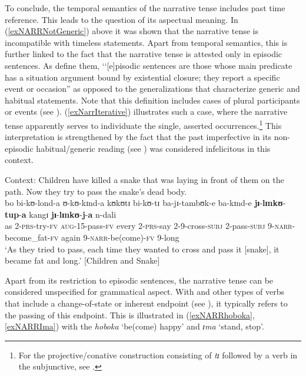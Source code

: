 \label{Episodic}
To conclude, the temporal semantics of the narrative tense includes past time reference. This leads to the question of its aspectual meaning. In (\ref{exNARRNotGeneric}) above it was shown that the narrative tense is incompatible with timeless  statements. Apart from temporal semantics, this is further linked to the fact that the narrative tense is attested only in episodic sentences. As \citet[36]{KrifkaMetal1995} define them, \lq\lq [e]pisodic sentences are those whose main predicate has a situation argument bound by existential closure; they report a specific event or occasion'' as opposed to the generalizations that characterize generic and habitual statements. Note that this definition includes cases of plural participants or events (see \citealt{CarlsonG2009}). (\ref{exNarrIterative}) illustrates such a case, where the narrative tense apparently serves to individuate the single, asserted occurrences.\footnote{For the projective/conative construction consisting of \textit{tɪ} followed by a verb in the subjunctive, see .} This interpretation is strengthened by the fact that the past imperfective in its non-episodic habitual/generic reading (see ) was considered infelicitous in this context.
\begin{exe}
\ex Context: Children have killed a snake that was laying in front of them on the path. Now they try to pass the snake's dead body. \label{exNarrIterative} \\
\gll bo bi-kʊ-lond-a ʊ-kʊ-kɪnd-a kʊkʊtɪ bi-kʊ-tɪ ba-jɪ-tambʊk-e ba-kɪnd-e \textbf{jɪ}-\textbf{lɪnkʊ}-\textbf{tup}-\textbf{a} kangɪ \textbf{jɪ}-\textbf{lɪnkʊ}-\textbf{j}-\textbf{a} n-dali\\
as 2-\textsc{prs}-try-\textsc{fv} \textsc{aug}-15-pass-\textsc{fv} every 2-\textsc{prs}-say 2-9-cross-\textsc{subj} 2-pass-\textsc{subj} 9-\textsc{narr}-become\_fat-\textsc{fv} again 9-\textsc{narr}-be(come)-\textsc{fv} 9-long\\
\glt \lq As they tried to pass, each time they wanted to cross and pass it [snake], it became fat and long.' [Children and Snake]
\end{exe}

Apart from its restriction to episodic sentences, the narrative tense can be considered unspecified for grammatical aspect. With  and other types of verbs that include a change-of-state or inherent endpoint (see ), it typically refers to the passing of this endpoint. This is illustrated in (\ref{exNARRhoboka}, \ref{exNARRIma}) with the  \textit{hoboka} \lq be(come) happy' and \textit{ɪma} \lq stand, stop'.


